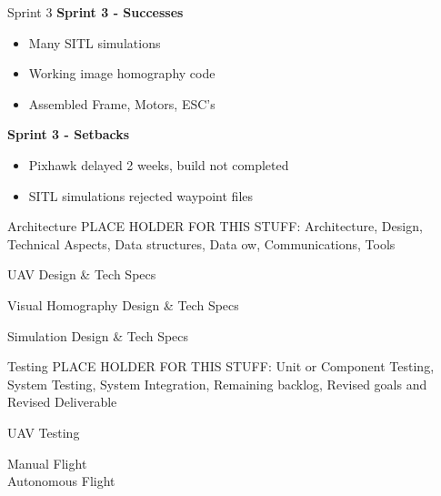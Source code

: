 \documentclass[11pt]{beamer}
\begin{document}
\begin{frame}{Sprint 3}
	\large{\textbf{Sprint 3 - Successes}}
	\begin{itemize}
		\item Many SITL simulations
		\item Working image homography code
		\item Assembled Frame, Motors, ESC's
	\end{itemize}
	\large{\textbf{Sprint 3 - Setbacks}}
	\begin{itemize}
		\item Pixhawk delayed 2 weeks, build not completed
		\item SITL simulations rejected waypoint files
	\end{itemize}
\end{frame}


\begin{frame}{Architecture}
PLACE HOLDER FOR THIS STUFF:
Architecture, Design, Technical Aspects, Data structures, Data ow, Communications, Tools
\end{frame}

\begin{frame}{UAV Design \& Tech Specs}

\end{frame}

\begin{frame}{Visual Homography Design \& Tech Specs}

\end{frame}

\begin{frame}{Simulation Design \& Tech Specs}

\end{frame}



\begin{frame}{Testing}
PLACE HOLDER FOR THIS STUFF:
Unit or Component Testing,  System Testing,  System Integration,  Remaining backlog,  Revised goals
and Revised Deliverable
\end{frame}

\begin{frame}{UAV Testing}

Manual Flight \\
Autonomous Flight \\

\end{frame}
\end{document}
